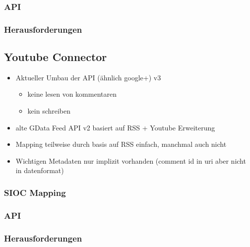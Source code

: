 \subsubsection{API} %
\label{ssub:google_plus_api}

\subsubsection{Herausforderungen} %
\label{ssub:google_plus_herausforderungen}





\subsection{Youtube Connector} %
\label{sub:youtube_connector}

\begin{itemize}
    \item Aktueller Umbau der API (ähnlich google+) v3
    \begin{itemize}
        \item keine lesen von kommentaren
        \item kein schreiben
    \end{itemize}
    \item alte GData Feed API v2 basiert auf RSS + Youtube Erweiterung
    \item Mapping teilweise durch basis auf RSS einfach, manchmal auch nicht
    \item Wichtigen Metadaten nur implizit vorhanden (comment id in uri aber nicht in datenformat)
\end{itemize}

\subsubsection{SIOC Mapping} %
\label{ssub:youtube_sioc_mapping}

\subsubsection{API} %
\label{ssub:youtube_api}

\subsubsection{Herausforderungen} %
\label{ssub:youtube_herausforderungen}

